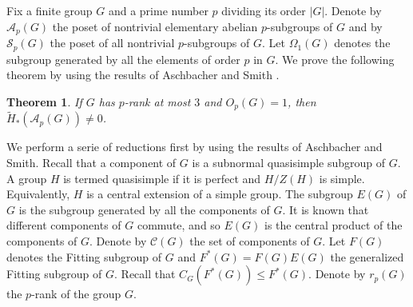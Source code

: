 \documentclass[11pt,twoside]{amsart}
\theoremstyle{plain}
\newtheorem{theorem}{Theorem}[section]
\theoremstyle{definition}
\theoremstyle{remark}
\def\A{{\mathcal A}}
\def\C{{\mathcal C}}
\def\S{{\mathcal S}}
\begin{document}
Fix a finite group $G$ and a prime number $p$ dividing its order $|G|$. Denote by $\A_p(G)$ the poset of nontrivial elementary abelian $p$-subgroups of $G$ and by $\S_p(G)$ the poset of all nontrivial $p$-subgroups of $G$. Let $\Omega_1(G)$ denotes the subgroup generated by all the elements of order $p$ in $G$. We prove the following theorem by using the results of Aschbacher and Smith \cite{AS93}.

\begin{theorem}
If $G$ has $p$-rank at most $3$ and $O_p(G) = 1$, then $\tilde{H}_*(\A_p(G))\neq 0$.
\end{theorem}

We perform a serie of reductions first by using the results of Aschbacher and Smith. Recall that a component of $G$ is a subnormal quasisimple subgroup of $G$. A group $H$ is termed quasisimple if it is perfect and $H/Z(H)$ is simple. Equivalently, $H$ is a central extension of a simple group. The subgroup $E(G)$ of $G$ is the subgroup generated by all the components of $G$. It is known that different components of $G$ commute, and so $E(G)$ is the central product of the components of $G$. Denote by $\C(G)$ the set of components of $G$. Let $F(G)$ denotes the Fitting subgroup of $G$ and $F^*(G) = F(G)E(G)$ the generalized Fitting subgroup of $G$. Recall that $C_G(F^*(G))\leq F ^*(G)$. Denote by $r_p(G)$ the $p$-rank of the group $G$.
\end{document}
